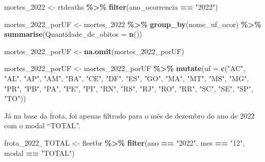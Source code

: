 \documentclass[
]{book}
\newenvironment{Shaded}{\begin{snugshade}}{\end{snugshade}}
\newcommand{\AttributeTok}[1]{\textcolor[rgb]{0.13,0.29,0.53}{#1}}
\newcommand{\FunctionTok}[1]{\textcolor[rgb]{0.13,0.29,0.53}{\textbf{#1}}}
\newcommand{\NormalTok}[1]{#1}
\newcommand{\OtherTok}[1]{\textcolor[rgb]{0.56,0.35,0.01}{#1}}
\newcommand{\SpecialCharTok}[1]{\textcolor[rgb]{0.81,0.36,0.00}{\textbf{#1}}}
\newcommand{\StringTok}[1]{\textcolor[rgb]{0.31,0.60,0.02}{#1}}
\begin{document}
\begin{Shaded}
\begin{Highlighting}[]
\NormalTok{mortes\_2022 }\OtherTok{\textless{}{-}}\NormalTok{ rtdeaths }\SpecialCharTok{\%\textgreater{}\%} 
  \FunctionTok{filter}\NormalTok{(ano\_ocorrencia }\SpecialCharTok{==} \StringTok{"2022"}\NormalTok{)}

\NormalTok{mortes\_2022\_porUF }\OtherTok{\textless{}{-}}\NormalTok{ mortes\_2022 }\SpecialCharTok{\%\textgreater{}\%} 
  \FunctionTok{group\_by}\NormalTok{(nome\_uf\_ocor) }\SpecialCharTok{\%\textgreater{}\%} 
  \FunctionTok{summarise}\NormalTok{(}\AttributeTok{Quantidade\_de\_obitos =} \FunctionTok{n}\NormalTok{())}

\NormalTok{mortes\_2022\_porUF }\OtherTok{\textless{}{-}} \FunctionTok{na.omit}\NormalTok{(mortes\_2022\_porUF)}

\NormalTok{mortes\_2022\_porUF }\OtherTok{\textless{}{-}}\NormalTok{ mortes\_2022\_porUF }\SpecialCharTok{\%\textgreater{}\%} 
  \FunctionTok{mutate}\NormalTok{(}\AttributeTok{uf =} \FunctionTok{c}\NormalTok{(}\StringTok{"AC"}\NormalTok{, }\StringTok{"AL"}\NormalTok{, }\StringTok{"AP"}\NormalTok{, }\StringTok{"AM"}\NormalTok{, }\StringTok{"BA"}\NormalTok{,}
                \StringTok{"CE"}\NormalTok{, }\StringTok{"DF"}\NormalTok{, }\StringTok{"ES"}\NormalTok{, }\StringTok{"GO"}\NormalTok{, }\StringTok{"MA"}\NormalTok{,}
                \StringTok{"MT"}\NormalTok{, }\StringTok{"MS"}\NormalTok{, }\StringTok{"MG"}\NormalTok{, }\StringTok{"PR"}\NormalTok{, }\StringTok{"PB"}\NormalTok{,}
                \StringTok{"PA"}\NormalTok{, }\StringTok{"PE"}\NormalTok{, }\StringTok{"PI"}\NormalTok{, }\StringTok{"RN"}\NormalTok{, }\StringTok{"RS"}\NormalTok{,}
                \StringTok{"RJ"}\NormalTok{, }\StringTok{"RO"}\NormalTok{, }\StringTok{"RR"}\NormalTok{, }\StringTok{"SC"}\NormalTok{, }\StringTok{"SE"}\NormalTok{, }
                \StringTok{"SP"}\NormalTok{, }\StringTok{"TO"}\NormalTok{))}
\end{Highlighting}
\end{Shaded}

Já na base da frota, foi apenas filtrado para o mẽs de dezembro do ano de 2022 com o modal ``TOTAL''.

\begin{Shaded}
\begin{Highlighting}[]
\NormalTok{frota\_2022\_TOTAL }\OtherTok{\textless{}{-}}\NormalTok{ fleetbr }\SpecialCharTok{\%\textgreater{}\%} 
  \FunctionTok{filter}\NormalTok{(ano }\SpecialCharTok{==} \StringTok{"2022"}\NormalTok{,}
\NormalTok{         mes }\SpecialCharTok{==} \StringTok{"12"}\NormalTok{,}
\NormalTok{         modal }\SpecialCharTok{==} \StringTok{"TOTAL"}\NormalTok{)}
\end{Highlighting}
\end{Shaded}
\end{document}
